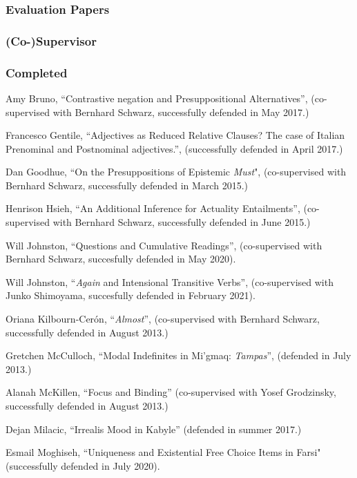 \documentclass[11pt]{article}
\begin{document}
\subsubsection*{Evaluation Papers}

\subsubsection*{(Co-)Supervisor}

\subsubsection*{Completed}


Amy Bruno, ``Contrastive negation and Presuppositional Alternatives'', (co-supervised with Bernhard Schwarz, successfully defended in May 2017.)

Francesco Gentile, ``Adjectives as Reduced Relative Clauses?
The case of Italian Prenominal and Postnominal adjectives.'', (successfully defended in April  2017.)

Dan Goodhue, ``On the Presuppositions of Epistemic \textit{Must}", (co-supervised with Bernhard Schwarz, successfully defended in March 2015.)

Henrison Hsieh, ``An Additional Inference for Actuality Entailments'',
(co-supervised with Bernhard Schwarz, successfully defended in June 2015.)

Will Johnston, ``Questions and Cumulative Readings'', (co-supervised with Bernhard Schwarz, succesfully defended in May 2020).

Will Johnston, ``\textit{Again} and Intensional Transitive Verbs'', (co-supervised with Junko Shimoyama, succesfully defended in February 2021).

Oriana Kilbourn-Cer\'on, ``\textit{Almost}'', (co-supervised with Bernhard Schwarz,
successfully defended in August 2013.) 


Gretchen McCulloch, ``Modal Indefinites in Mi'gmaq: \textit{Tampas}'', (defended in July 2013.)

Alanah McKillen, ``Focus and Binding'' (co-supervised with Yosef
Grodzinsky, successfully defended in August 2013.)

Dejan Milacic, ``Irrealis Mood in Kabyle'' (defended in summer 2017.)

Esmail Moghiseh, ``Uniqueness and Existential Free Choice Items in Farsi" (successfully defended in July 2020).
\end{document}
